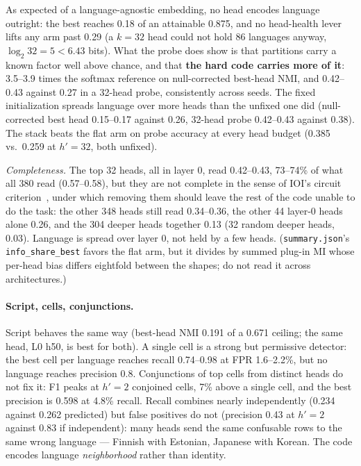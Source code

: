As expected of a language-agnostic embedding, no head encodes language
outright: the best reaches 0.18 of an attainable 0.875, and no head-health
lever lifts any arm past 0.29 (a $k{=}32$ head could not hold 86
languages anyway, $\log_2 32 = 5 < 6.43$ bits). What the probe does show
is that partitions carry a known factor well above chance, and that
\textbf{the hard code carries more of it}: 3.5--3.9 times the softmax
reference on null-corrected best-head NMI, and 0.42--0.43 against 0.27
in a 32-head probe, consistently across seeds. The fixed initialization
spreads language over more heads than the unfixed one did
(null-corrected best head 0.15--0.17 against 0.26, 32-head probe
0.42--0.43 against 0.38). The stack beats the flat arm on probe accuracy at every head
budget (0.385 vs.\ 0.259 at $h'{=}32$, both unfixed).

\emph{Completeness.} The top 32 heads, all in layer 0, read 0.42--0.43,
73--74\% of what all 380 read (0.57--0.58), but they are not complete in
the sense of IOI's circuit criterion~\cite{wang2023ioi}, under which
removing them should leave the rest of the code unable to do the task:
the other 348 heads still read 0.34--0.36, the other 44 layer-0 heads
alone 0.26, and the 304 deeper heads together 0.13 (32 random deeper
heads, 0.03). Language is spread over layer 0, not held by a few heads. (\texttt{summary.json}'s
\texttt{info\_share\_best} favors the flat arm, but it divides by summed
plug-in MI whose per-head bias differs eightfold between the shapes; do
not read it across architectures.)

\paragraph{Script, cells, conjunctions.} Script behaves the same way
(best-head NMI 0.191 of a 0.671 ceiling; the same head, L0 h50, is best
for both). A single cell is a strong but permissive detector: the best
cell per language reaches recall 0.74--0.98 at FPR 1.6--2.2\%, but no
language reaches precision 0.8. Conjunctions of top cells from distinct
heads do not fix it: F1 peaks at $h'{=}2$ conjoined cells, 7\% above a
single cell, and the best precision is 0.598 at 4.8\% recall. Recall
combines nearly independently (0.234 against 0.262 predicted) but false
positives do not (precision 0.43 at $h'{=}2$ against 0.83 if independent): many heads send
the same confusable rows to the same wrong language --- Finnish with
Estonian, Japanese with Korean. The code encodes language
\emph{neighborhood} rather than identity.

